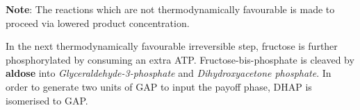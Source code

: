 \documentclass[12pt]{article}
\begin{document}
\textbf{Note}: The reactions which are not thermodynamically favourable is made to proceed via lowered product concentration.

In the next thermodynamically favourable irreversible step, fructose is further phosphorylated by consuming an extra ATP. Fructose-bis-phosphate is cleaved by \textbf{aldose} into \textit{Glyceraldehyde-3-phosphate} and \textit{Dihydroxyacetone phosphate}. In order to generate two units of GAP to input the payoff phase, DHAP is isomerised to GAP.
\end{document}
